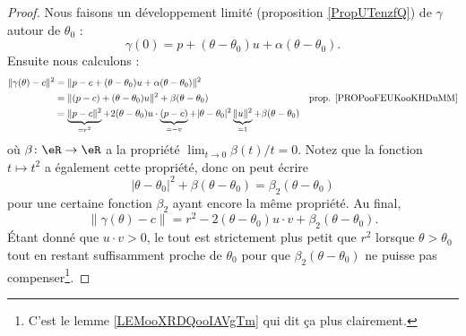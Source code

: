 \begin{proof}
	Nous faisons un développement limité (proposition \ref{PropUTenzfQ}) de \( \gamma\) autour de \( \theta_0\) :
	\begin{equation}
		\gamma(0)=p+(\theta-\theta_0)u+\alpha(\theta-\theta_0).
	\end{equation}
	Ensuite nous calculons :
	\begin{subequations}
		\begin{align}
			\| \gamma(\theta)-c \|^2 & =\| p-c+(\theta-\theta_0)u+\alpha(\theta-\theta_0) \|^2                                                                                                                                            \\
			                         & =\| (p-c)+(\theta-\theta_0)u \|^2+\beta(\theta-\theta_0)                                                                                                   & \text{prop. \ref{PROPooFEUKooKHDuMM}} \\
			                         & =\underbrace{\| p-c \|^2}_{=r^2}+2(\theta-\theta_0)u\cdot \underbrace{(p-c)}_{=-v}+| \theta-\theta_0 |^2\underbrace{\| u \|^2}_{=1}+\beta(\theta-\theta_0)
		\end{align}
	\end{subequations}
	où \(\beta \colon \eR\to \eR  \) a la propriété \( \lim_{t\to 0}\beta(t)/t=0\). Notez que la fonction \( t\mapsto t^2\) a également cette propriété, donc on peut écrire
	\begin{equation}
		| \theta-\theta_0 |^2+\beta(\theta-\theta_0)=\beta_2(\theta-\theta_0)
	\end{equation}
	pour une certaine fonction \( \beta_2\) ayant encore la même propriété. Au final,
	\begin{equation}
		\| \gamma(\theta)-c \|=r^2-2(\theta-\theta_0)u\cdot v+\beta_2(\theta-\theta_0).
	\end{equation}
	Étant donné que \( u\cdot v>0\), le tout est strictement plus petit que \( r^2\) lorsque \( \theta>\theta_0\) tout en restant suffisamment proche de \( \theta_0\) pour que \( \beta_2(\theta-\theta_0)\) ne puisse pas compenser\footnote{C'est le lemme \ref{LEMooXRDQooIAVgTm} qui dit ça plus clairement.}.
\end{proof}


